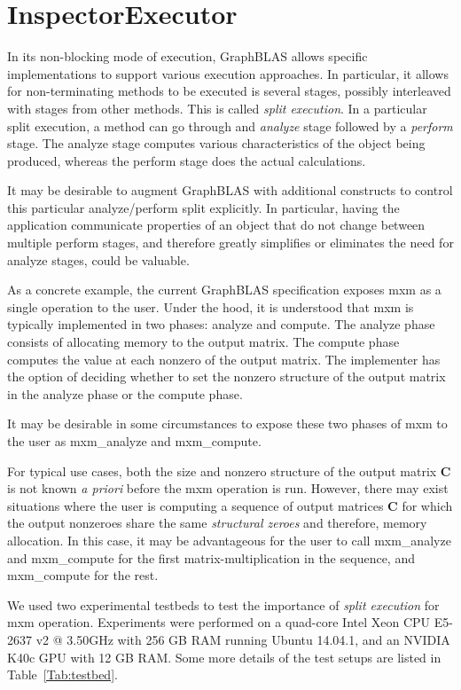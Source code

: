\section{InspectorExecutor}

In its non-blocking mode of execution, GraphBLAS allows specific implementations to support
various execution approaches. In particular, it allows for non-terminating methods to be 
executed is several stages, possibly interleaved with stages from other methods. This is called \emph{split execution}. In a particular split execution,
a method can go through and \emph{analyze} stage followed by a \emph{perform} stage.
The analyze stage computes various characteristics of the object being produced, whereas the
perform stage does the actual calculations.

It may be desirable to augment GraphBLAS with additional constructs to control this particular
analyze/perform split explicitly. In particular, having the application communicate properties of
an object that do not change between multiple perform stages, and therefore greatly simplifies
or eliminates the need for analyze stages, could be valuable.

As a concrete example, the current GraphBLAS specification exposes {\sf mxm} as a single operation to the user. Under the hood, it is understood that {\sf mxm} is typically implemented in two phases: analyze and compute. The analyze phase consists of allocating memory to the output matrix. The compute phase computes the value at each nonzero of the output matrix. The implementer has the option of deciding whether to set the nonzero structure of the output matrix in the analyze phase or the compute phase.

It may be desirable in some circumstances to expose these two phases of {\sf mxm} to the user as {\sf mxm\_analyze} and {\sf mxm\_compute}. 

For typical use cases, both the size and nonzero structure of the output matrix \textbf{C} is not known \emph{a priori} before the {\sf mxm} operation is run. However, there may exist situations where the user is computing a sequence of output matrices \textbf{C} for which the output nonzeroes share the same \emph{structural zeroes} and therefore, memory allocation. In this case, it may be advantageous for the user to call {\sf mxm\_analyze} and {\sf mxm\_compute} for the first matrix-multiplication in the sequence, and {\sf mxm\_compute} for the rest.

We used two experimental testbeds to test the importance of \emph{split execution} for {\sf mxm} operation. Experiments were performed on a quad-core Intel Xeon CPU E5-2637 v2 @ 3.50GHz with 256 GB RAM running Ubuntu 14.04.1, and an NVIDIA K40c GPU with 12 GB RAM. Some more details of the test setups are listed in Table~\ref{Tab:testbed}.

